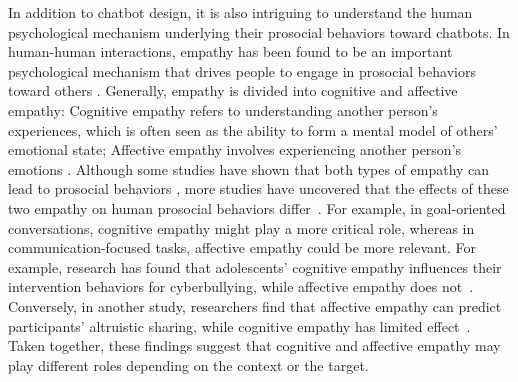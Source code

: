 In addition to chatbot design, it is also intriguing to understand the human psychological mechanism underlying their prosocial behaviors toward chatbots. In human-human interactions, empathy has been found to be an important psychological mechanism that drives people to engage in prosocial behaviors toward others \cite{hoffman2008empathy}. Generally, empathy is divided into cognitive and affective empathy: Cognitive empathy refers to understanding another person’s experiences, which is often seen as the ability to form a mental model of others' emotional state; Affective empathy involves experiencing another person’s emotions \cite{byrne2013structural, gini2007does, Renate2011QCAE}. 
Although some studies have shown that both types of empathy can lead to prosocial behaviors \cite{hoffman2008empathy, Eisenberg1987, yin2023empathy}, more studies have uncovered that the effects of these two empathy on human prosocial behaviors differ~\cite{barlinska2018cyberbullying, edele2013explaining, brazil2023empathy}. 
For example, in goal-oriented conversations, cognitive empathy might play a more critical role, whereas in communication-focused tasks, affective empathy could be more relevant.
For example, research has found that adolescents' cognitive empathy influences their intervention behaviors for cyberbullying, while affective empathy does not~\cite{barlinska2018cyberbullying}. 
Conversely, in another study, researchers find that affective empathy can predict participants' altruistic sharing, while cognitive empathy has limited effect~\cite{edele2013explaining}. 
Taken together, these findings suggest that cognitive and affective empathy may play different roles depending on the context or the target. 



